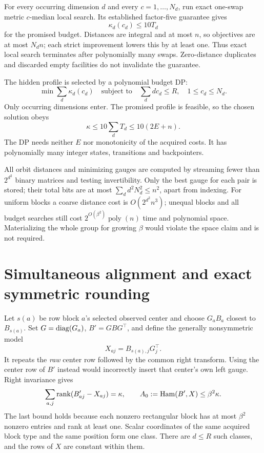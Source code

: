 \documentclass[11pt,a4paper]{article}
\newcommand{\rank}{\operatorname{rank}}\newcommand{\poly}{\operatorname{poly}}
\begin{document}
For every occurring dimension $d$ and every $c=1,\ldots,N_d$,
run exact one-swap metric $c$-median local search. Its established
factor-five guarantee \cite{arya} gives
\[
\kappa_d(c_d)\le10T_d
\]
for the promised budget. Distances are integral and at most $n$,
so objectives are at most $N_dn$; each strict improvement lowers
this by at least one. Thus exact local search terminates after
polynomially many swaps. Zero-distance duplicates and discarded
empty facilities do not invalidate the guarantee.

The hidden profile is selected by a polynomial budget DP:
\[
\min\sum_d\kappa_d(c_d)\quad\text{subject to}\quad
\sum_d d c_d\le R,\quad 1\le c_d\le N_d.
\]
Only occurring dimensions enter. The promised profile is feasible,
so the chosen solution obeys
\begin{equation}\label{eq:kappa}
\kappa\le10\sum_dT_d\le10(2E+n).
\end{equation}
The DP needs neither $E$ nor monotonicity of the acquired costs.
It has polynomially many integer states, transitions and backpointers.

All orbit distances and minimizing gauges are computed by streaming
fewer than $2^{d^2}$ binary matrices and testing invertibility.
Only the best gauge for each pair is stored; their total bits are
at most $\sum_d d^2N_d^2\le n^2$, apart from indexing.
For uniform blocks a coarse distance cost is $O(2^{d^2}n^3)$;
unequal blocks and all budget searches still cost
$2^{O(\beta^2)}\poly(n)$ time and polynomial space.
Materializing the whole group for growing $\beta$ would violate
the space claim and is not required.

\section{Simultaneous alignment and exact symmetric rounding}
\label{sec:round}
Let $s(a)$ be row block $a$'s selected observed center and choose
$G_aB_a$ closest to $B_{s(a)}$. Set $G=\operatorname{diag}(G_a)$, $B'=GBG^\top$,
and define the generally nonsymmetric model
\[
X_{aj}=B_{s(a),j}G_j^\top.
\]
It repeats the \emph{raw} center row followed by the common right
transform. Using the center row of $B'$ instead would incorrectly
insert that center's own left gauge. Right invariance gives
\[
\sum_{a,j}\rank(B'_{aj}-X_{aj})=\kappa,\qquad
A_0:=\ham(B',X)\le\beta^2\kappa.
\]
The last bound holds because each nonzero rectangular block has
at most $\beta^2$ nonzero entries and rank at least one.
Scalar coordinates of the same acquired block type and the same
position form one class. There are $d\le R$ such classes, and
the rows of $X$ are constant within them.
\end{document}
